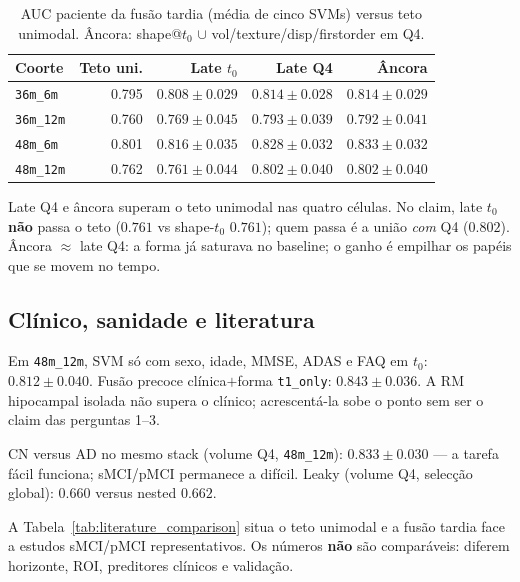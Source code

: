 \documentclass[review]{elsarticle}
\newcommand{\code}[1]{\texttt{#1}}
\begin{document}
\begin{table}[htbp]
\centering
\caption{AUC paciente da fusão tardia (média de cinco SVMs) versus teto unimodal.
Âncora: shape@$t_0$ $\cup$ vol/texture/disp/firstorder em Q4.}
\label{tab:late_4}
\begin{tabular}{lrrrr}
\toprule
Coorte & Teto uni. & Late $t_0$ & Late Q4 & Âncora \\
\midrule
\code{36m\_6m} & 0.795 & $0.808\pm 0.029$ & $0.814\pm 0.028$ & $0.814\pm 0.029$ \\
\code{36m\_12m} & 0.760 & $0.769\pm 0.045$ & $0.793\pm 0.039$ & $0.792\pm 0.041$ \\
\code{48m\_6m} & 0.801 & $0.816\pm 0.035$ & $0.828\pm 0.032$ & $\mathbf{0.833\pm 0.032}$ \\
\code{48m\_12m} & 0.762 & $0.761\pm 0.044$ & $\mathbf{0.802\pm 0.040}$ & $\mathbf{0.802\pm 0.040}$ \\
\bottomrule
\end{tabular}
\end{table}

Late Q4 e âncora superam o teto unimodal nas quatro células.
No claim, late $t_0$ \textbf{não} passa o teto ($0.761$ vs shape-$t_0$ $0.761$); quem passa é a união \emph{com} Q4 ($0.802$).
Âncora $\approx$ late Q4: a forma já saturava no baseline; o ganho é empilhar os papéis que se movem no tempo.

\subsection{Clínico, sanidade e literatura}
\label{subsec:controlos}

Em \code{48m\_12m}, SVM só com sexo, idade, MMSE, ADAS e FAQ em $t_0$: $0.812\pm 0.040$.
Fusão precoce clínica$+$forma \code{t1\_only}: $0.843\pm 0.036$.
A RM hipocampal isolada não supera o clínico; acrescentá-la sobe o ponto sem ser o claim das perguntas 1--3.

CN versus AD no mesmo stack (volume Q4, \code{48m\_12m}): $0.833\pm 0.030$ --- a tarefa fácil funciona; sMCI/pMCI permanece a difícil.
Leaky (volume Q4, selecção global): $0.660$ versus nested $0.662$.

A Tabela~\ref{tab:literature_comparison} situa o teto unimodal e a fusão tardia face a estudos sMCI/pMCI representativos.
Os números \textbf{não} são comparáveis: diferem horizonte, ROI, preditores clínicos e validação.
\end{document}
